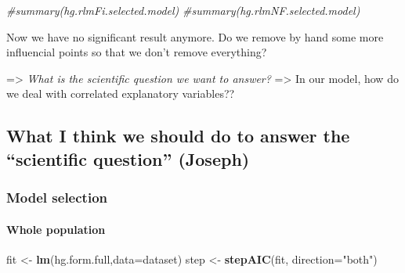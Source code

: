\documentclass[12pt,]{article}
\newenvironment{Shaded}{\begin{snugshade}}{\end{snugshade}}
\newcommand{\KeywordTok}[1]{\textcolor[rgb]{0.13,0.29,0.53}{\textbf{#1}}}
\newcommand{\DataTypeTok}[1]{\textcolor[rgb]{0.13,0.29,0.53}{#1}}
\newcommand{\StringTok}[1]{\textcolor[rgb]{0.31,0.60,0.02}{#1}}
\newcommand{\CommentTok}[1]{\textcolor[rgb]{0.56,0.35,0.01}{\textit{#1}}}
\newcommand{\NormalTok}[1]{#1}
\let\oldparagraph\paragraph
\renewcommand{\paragraph}[1]{\oldparagraph{#1}\mbox{}}
\begin{document}
\begin{Shaded}
\begin{Highlighting}[]
\CommentTok{#summary(hg.rlmFi.selected.model)}
\CommentTok{#summary(hg.rlmNF.selected.model)}
\end{Highlighting}
\end{Shaded}

Now we have no significant result anymore. Do we remove by hand some
more influencial points so that we don't remove everything?

=\textgreater{} \emph{What is the scientific question we want to
answer?} =\textgreater{} In our model, how do we deal with correlated
explanatory variables??

\subsection{\texorpdfstring{What I think we should do to answer the
``scientific question''
(Joseph)}{What I think we should do to answer the scientific question (Joseph)}}\label{what-i-think-we-should-do-to-answer-the-scientific-question-joseph}

\subsubsection{Model selection}\label{model-selection}

\paragraph{Whole population}\label{whole-population}

\begin{Shaded}
\begin{Highlighting}[]
\NormalTok{fit <-}\StringTok{ }\KeywordTok{lm}\NormalTok{(hg.form.full,}\DataTypeTok{data=}\NormalTok{dataset)}
\NormalTok{step <-}\StringTok{ }\KeywordTok{stepAIC}\NormalTok{(fit, }\DataTypeTok{direction=}\StringTok{"both"}\NormalTok{)}
\end{Highlighting}
\end{Shaded}
\end{document}
